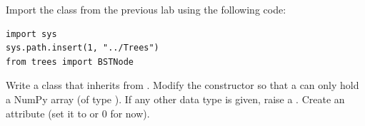 \begin{problem} %
Import the  class from the previous lab using the following code:
\begin{lstlisting}
import sys
sys.path.insert(1, "../Trees")
from trees import BSTNode
\end{lstlisting}
Write a  class that inherits from .
Modify the constructor so that a  can only hold a NumPy array (of type ).
If any other data type is given, raise a .
Create an  attribute (set it to  or $0$ for now).

\end{problem}

